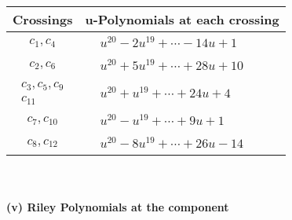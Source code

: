 \documentclass[1p]{elsarticle_modified}
\theoremstyle{definition}
\begin{document}
\begin{tabular}{m{50pt}|m{274pt}}
Crossings & \hspace{64pt}u-Polynomials at each crossing \\
\hline $$\begin{aligned}c_{1},c_{4}\end{aligned}$$&$\begin{aligned}
&u^{20}-2 u^{19}+\cdots-14 u+1
\end{aligned}$\\
\hline $$\begin{aligned}c_{2},c_{6}\end{aligned}$$&$\begin{aligned}
&u^{20}+5 u^{19}+\cdots+28 u+10
\end{aligned}$\\
\hline $$\begin{aligned}c_{3},c_{5},c_{9}\\c_{11}\end{aligned}$$&$\begin{aligned}
&u^{20}+u^{19}+\cdots+24 u+4
\end{aligned}$\\
\hline $$\begin{aligned}c_{7},c_{10}\end{aligned}$$&$\begin{aligned}
&u^{20}- u^{19}+\cdots+9 u+1
\end{aligned}$\\
\hline $$\begin{aligned}c_{8},c_{12}\end{aligned}$$&$\begin{aligned}
&u^{20}-8 u^{19}+\cdots+26 u-14
\end{aligned}$\\
\hline
\end{tabular}\\~\\
\newpage\renewcommand{\arraystretch}{1}
\flushleft \textbf{(v) Riley Polynomials at the component}\newline \\
\end{document}
